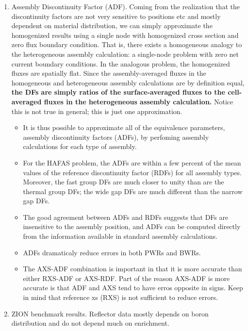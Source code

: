\documentclass{school-22.211-notes}
\begin{document}
\begin{enumerate}
\item Assembly Discontinuity Factor (ADF). Coming from the realization that the discontinuity factors are not very sensitive to positions etc and mostly dependent on material distribution, we can simply approximate the homogenized results using a single node with homogenized cross section and zero flux boundary condition. That is, there exists a homogeneous analogy to the heterogeneous assembly calculation: a single-node problem with zero net current boundary conditions. In the analogous problem, the homogenized fluxes are spatially flat. Since the assembly-averaged fluxes in the homogeneous and heterogeneous assembly calculations are by definition equal, \textbf{the DFs are simply ratios of the surface-averaged fluxes to the cell-averaged fluxes in the heterogeneous assembly calculation.} Notice this is not true in general; this is just one approximation. 
  \begin{itemize}
  \item It is thus possible to approximate all of the equivalence parameters, assembly discontinuity factors (ADFs), by perfoming assembly calculations for each type of assembly. 
  \item For the HAFAS problem, the ADFs are within a few percent of the mean values of the reference discontinuity factor (RDFs) for all assembly types. Moreover, the fast group DFs are much closer to unity than are the thermal group DFs; the wide gap DFs are much different than the narrow gap DFs. 
  \item The good agreement between ADFs and RDFs suggests that DFs are insensitive to the assembly position, and ADFs can be computed directly from the information available in standard assembly calculations. 
  \item ADFs dramaticaly reduce errors in both PWRs and BWRs. 
  \item The AXS-ADF combination is important in that it is more accurate than either RXS-ADF or AXS-RDF. Part of the reason AXS-ADF is more accurate is that ADF and AXS tend to have erros opposite in signs. Keep in mind that reference xs (RXS) is not sufficient to reduce errors. 
  \end{itemize}


\item ZION benchmark results. Reflector data mostly depends on boron distribution and do not depend much on enrichment. 
\end{enumerate}
\end{document}
